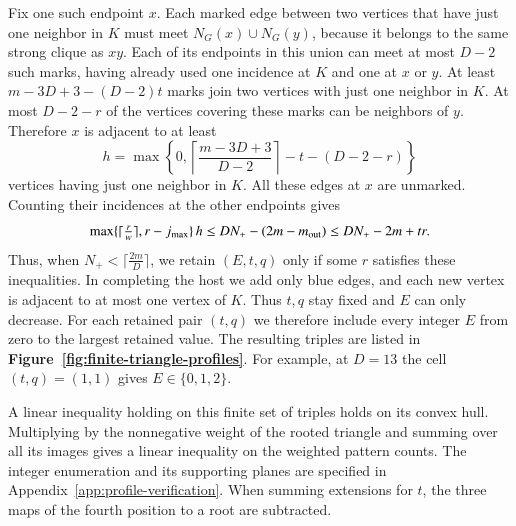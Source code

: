 Fix one such endpoint $x$. Each marked edge between two vertices that
have just one neighbor in $K$ must meet $N_G(x)\cup N_G(y)$, because
it belongs to the same strong clique as $xy$. Each of its endpoints in
this union can meet at most $D-2$ such marks, having already used one
incidence at $K$ and one at $x$ or $y$. At least
$m-3D+3-(D-2)t$ marks join two vertices with just one neighbor in $K$.
At most $D-2-r$ of the vertices covering these marks can be neighbors of
$y$. Therefore $x$ is adjacent to at least
\[
 h=\max\left\{0,\left\lceil\frac{m-3D+3}{D-2}\right\rceil-t-(D-2-r)\right\}
\]
vertices having just one neighbor in $K$. All these edges at $x$
are unmarked. Counting their incidences at the other endpoints gives
\[
 \max\{\lceil\tfrac{r}{w}\rceil,r-j_{\max}\}\,h
 \le DN_+-(2m-m_{\rm out})\le DN_+-2m+tr .
\]
Thus, when $N_+<\lceil\frac{2m}{D}\rceil$, we retain $(E,t,q)$ only
if some $r$ satisfies these inequalities. In completing the host
we add only blue edges, and each new vertex is adjacent to at most
one vertex of $K$. Thus $t,q$ stay fixed and $E$ can only decrease.
For each retained pair $(t,q)$ we therefore include every integer $E$
from zero to the largest retained value. The resulting triples are
listed in \textbf{Figure~\ref{fig:finite-triangle-profiles}}. For example,
at $D=13$ the cell $(t,q)=(1,1)$ gives $E\in\{0,1,2\}$.

A linear inequality holding on this finite
set of triples holds on its convex hull. Multiplying by the
nonnegative weight of the rooted triangle and summing over all its
images gives a linear inequality on the weighted pattern counts.
The integer enumeration and its supporting planes are specified in
Appendix~\ref{app:profile-verification}. When summing extensions for
$t$, the three maps of the fourth position to a root are subtracted.
